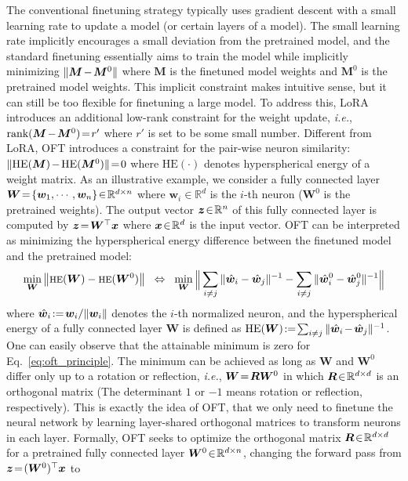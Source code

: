 \documentclass{article}
\newcommand{\ie}{\emph{i.e.}}
\begin{document}
The conventional finetuning strategy typically uses gradient descent with a small learning rate to update a model (or certain layers of a model). The small learning rate implicitly encourages a small deviation from the pretrained model, and the standard finetuning essentially aims to train the model while implicitly minimizing $\thickmuskip=2mu \medmuskip=2mu \| \bm{M} - \bm{M}^0\|$ where $\bm{M}$ is the finetuned model weights and $\bm{M}^0$ is the pretrained model weights. This implicit constraint makes intuitive sense, but it can still be too flexible for finetuning a large model. To address this, LoRA introduces an additional low-rank constraint for the weight update, \ie, $\thickmuskip=2mu \medmuskip=2mu \text{rank}(\bm{M} - \bm{M}^0)=r'$ where $r'$ is set to be some small number. Different from LoRA, OFT introduces a constraint for the pair-wise neuron similarity: $\thickmuskip=2mu \medmuskip=2mu \| \text{HE}(\bm{M})-\text{HE}(\bm{M}^0) \|=0$ where $\text{HE}(\cdot)$ denotes hyperspherical energy of a weight matrix. As an illustrative example, we consider a fully connected layer $\thickmuskip=2mu \medmuskip=2mu \bm{W}=\{\bm{w}_1,\cdots,\bm{w}_n\}\in\mathbb{R}^{d\times n}$ where $\bm{w}_i\in\mathbb{R}^{d}$ is the $i$-th neuron ($\bm{W}^0$ is the pretrained weights). The output vector $\thickmuskip=2mu \medmuskip=2mu \bm{z}\in\mathbb{R}^n$ of this fully connected layer is computed by $\thickmuskip=2mu \medmuskip=2mu \bm{z}=\bm{W}^\top\bm{x}$ where $\thickmuskip=2mu \medmuskip=2mu \bm{x}\in\mathbb{R}^d$ is the input vector. OFT can be interpreted as minimizing the hyperspherical energy difference between the finetuned model and the pretrained model:
\begin{equation}\label{eq:oft_principle}
\footnotesize
\min_{\bm{W}} \left\| \text{HE}(\bm{W})-\text{HE}(\bm{W}^0)\right\|~~\Leftrightarrow~~\min_{\bm{W}} \bigg{\|} \sum_{i\neq j} \|\hat{\bm{w}}_i-\hat{\bm{w}}_j\|^{-1}-\sum_{i\neq j} \|\hat{\bm{w}}^0_i-\hat{\bm{w}}^0_j\|^{-1}\bigg{\|}
\end{equation}
where $\thickmuskip=2mu \medmuskip=2mu \hat{\bm{w}}_i:=\bm{w}_i/\|\bm{w}_i\|$ denotes the $i$-th normalized neuron, and the hyperspherical energy of a fully connected layer $\bm{W}$ is defined as $\thickmuskip=2mu \medmuskip=2mu \text{HE}(\bm{W}):= \sum_{i\neq j} \|\hat{\bm{w}}_i-\hat{\bm{w}}_j\|^{-1}$. One can easily observe that the attainable minimum is zero for Eq.~\eqref{eq:oft_principle}. The minimum can be achieved as long as $\bm{W}$ and $\bm{W}^0$ differ only up to a rotation or reflection, \ie, $\thickmuskip=2mu \medmuskip=2mu \bm{W}=\bm{R}\bm{W}^0$ in which $\thickmuskip=2mu \medmuskip=2mu \bm{R}\in\mathbb{R}^{d\times d}$ is an orthogonal matrix (The determinant $1$ or $-1$ means rotation or reflection, respectively). This is exactly the idea of OFT, that we only need to finetune the neural network by learning layer-shared orthogonal matrices to transform neurons in each layer. Formally, OFT seeks to optimize the orthogonal matrix $\thickmuskip=2mu \medmuskip=2mu \bm{R}\in\mathbb{R}^{d \times d}$ for a pretrained fully connected layer $\thickmuskip=2mu \medmuskip=2mu\bm{W}^0\in\mathbb{R}^{d\times n}$, changing the forward pass from $\thickmuskip=2mu \medmuskip=2mu\bm{z}=(\bm{W}^0)^\top\bm{x}$ to
\end{document}
